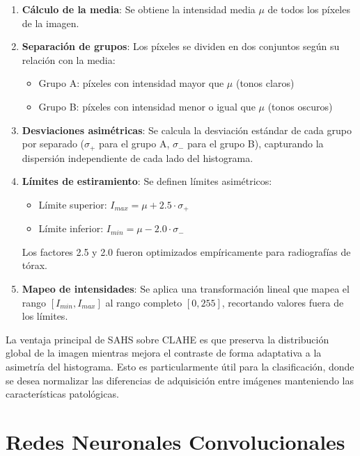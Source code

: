 \begin{enumerate}
    \item \textbf{Cálculo de la media}: Se obtiene la intensidad media $\mu$ de todos los píxeles de la imagen.

    \item \textbf{Separación de grupos}: Los píxeles se dividen en dos conjuntos según su relación con la media:
    \begin{itemize}
        \item Grupo A: píxeles con intensidad mayor que $\mu$ (tonos claros)
        \item Grupo B: píxeles con intensidad menor o igual que $\mu$ (tonos oscuros)
    \end{itemize}

    \item \textbf{Desviaciones asimétricas}: Se calcula la desviación estándar de cada grupo por separado ($\sigma_+$ para el grupo A, $\sigma_-$ para el grupo B), capturando la dispersión independiente de cada lado del histograma.

    \item \textbf{Límites de estiramiento}: Se definen límites asimétricos:
    \begin{itemize}
        \item Límite superior: $I_{max} = \mu + 2.5 \cdot \sigma_+$
        \item Límite inferior: $I_{min} = \mu - 2.0 \cdot \sigma_-$
    \end{itemize}
    Los factores 2.5 y 2.0 fueron optimizados empíricamente para radiografías de tórax.

    \item \textbf{Mapeo de intensidades}: Se aplica una transformación lineal que mapea el rango $[I_{min}, I_{max}]$ al rango completo $[0, 255]$, recortando valores fuera de los límites.
\end{enumerate}

La ventaja principal de SAHS sobre CLAHE es que preserva la distribución global de la imagen mientras mejora el contraste de forma adaptativa a la asimetría del histograma. Esto es particularmente útil para la clasificación, donde se desea normalizar las diferencias de adquisición entre imágenes manteniendo las características patológicas.



\section{Redes Neuronales Convolucionales}
\label{sec:cnn}

